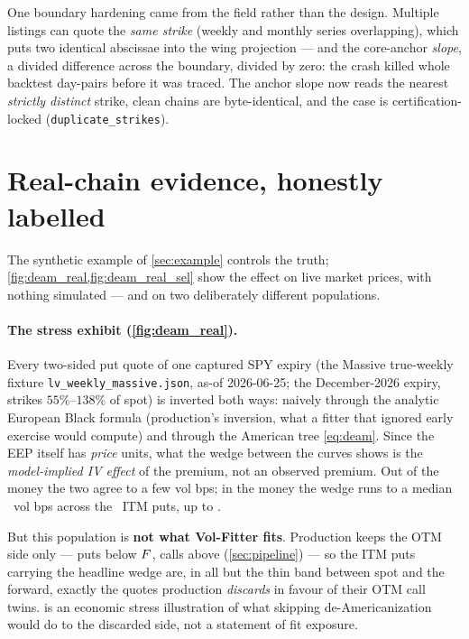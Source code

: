 \documentclass[11pt]{article}
\begin{document}
One boundary hardening came from the field rather than the design. Multiple
listings can quote the \emph{same strike} (weekly and monthly series
overlapping), which puts two identical abscissae into the wing projection ---
and the core-anchor \emph{slope}, a divided difference across the boundary,
divided by zero: the crash killed whole backtest day-pairs before it was
traced. The anchor slope now reads the nearest \emph{strictly distinct}
strike, clean chains are byte-identical, and the case is certification-locked
(\texttt{duplicate\_strikes}).

\section{Real-chain evidence, honestly labelled}
\label{sec:real}

The synthetic example of \cref{sec:example} controls the truth;
\cref{fig:deam_real,fig:deam_real_sel} show the effect on live market prices,
with nothing simulated --- and on two deliberately different populations.

\paragraph{The stress exhibit (\cref{fig:deam_real}).}
Every two-sided put quote of one captured SPY expiry (the Massive true-weekly
fixture \texttt{lv\_weekly\_massive.json}, as-of 2026-06-25; the December-2026
expiry, strikes $55\%$--$138\%$ of spot) is inverted both ways: naively through
the analytic European Black formula (production's inversion, what a fitter that
ignored early exercise would compute) and through the American tree
\eqref{eq:deam}. Since the EEP itself has \emph{price} units, what the wedge
between the curves shows is the \emph{model-implied IV effect} of the premium,
not an observed premium. Out of the money the two agree to a few vol bps; in
the money the wedge runs to a median \deamrealmedianitm\ vol bps across the
\deamrealnitm\ ITM puts, up to \deamrealmaxbias.

But this population is \textbf{not what Vol-Fitter fits}. Production keeps the
OTM side only --- puts below $F$, calls above (\cref{sec:pipeline}) --- so
the ITM puts carrying the headline wedge are, in all but the thin band between
spot and the forward, exactly the quotes production \emph{discards} in favour
of their OTM call twins.  is an
economic stress illustration of what skipping de-Americanization would do to
the discarded side, not a statement of fit exposure.
\end{document}
